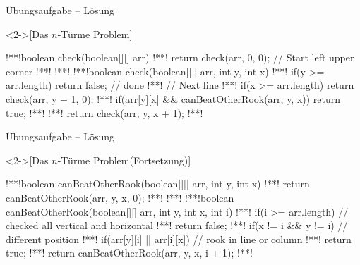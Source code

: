 \begin{frame}[fragile,c]{Übungsaufgabe -- Lösung}
    \begin{solve}<2->[Das \(n\)-Türme Problem]
\begin{plainjava}
!**!boolean check(boolean[][] arr) {
!**!    return check(arr, 0, 0); // Start left upper corner
!**!}
!**!
!**!boolean check(boolean[][] arr, int y, int x) {
!**!    if(y >= arr.length) return false; // done
!**!    // Next line
!**!    if(x >= arr.length) return check(arr, y + 1, 0);
!**!    if(arr[y][x] && canBeatOtherRook(arr, y, x)) return true;
!**!
!**!    return check(arr, y, x + 1);
!**!}
\end{plainjava}
    \end{solve}
\end{frame}

\begin{frame}[fragile,c]{Übungsaufgabe -- Lösung}
    \addtocounter{solve}{-1}%
    \begin{solve}<2->[Das \(n\)-Türme Problem\hfill(Fortsetzung)]
\begin{plainjava}
!**!boolean canBeatOtherRook(boolean[][] arr, int y, int x) {
!**!    return canBeatOtherRook(arr, y, x, 0);
!**!}
!**!
!**!boolean canBeatOtherRook(boolean[][] arr, int y, int x, int i) {
!**!    if(i >= arr.length) // checked all vertical and horizontal
!**!        return false;
!**!    if(x != i && y != i) // different position
!**!        if(arr[y][i] || arr[i][x]) // rook in line or column
!**!            return true;
!**!    return canBeatOtherRook(arr, y, x, i + 1);
!**!}
\end{plainjava}
    \end{solve}
\end{frame}
\fi
